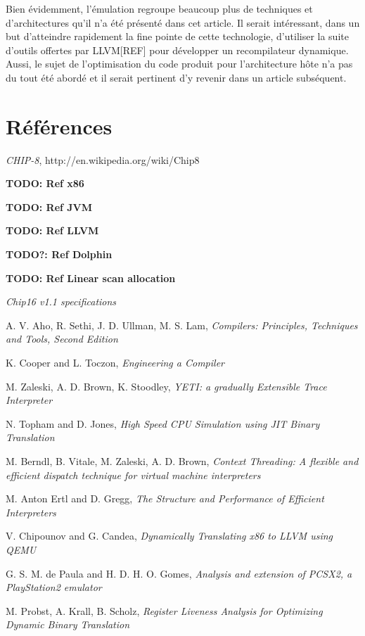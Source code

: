 \documentclass{article} %
\begin{document}
Bien évidemment, l'émulation regroupe beaucoup plus de techniques et d'architectures qu'il n'a été présenté dans cet article. Il serait intéressant, dans un but d'atteindre rapidement la fine pointe de cette technologie, d'utiliser la suite d'outils offertes par LLVM[REF] pour développer un recompilateur dynamique. Aussi, le sujet de l'optimisation du code produit pour l'architecture hôte n'a pas du tout été abordé et il serait pertinent d'y revenir dans un article subséquent.

\section{Références}
\small{
\textit{CHIP-8}, http://en.wikipedia.org/wiki/Chip8

\textbf{TODO: Ref x86}

\textbf{TODO: Ref JVM}

\textbf{TODO: Ref LLVM}

\textbf{TODO?: Ref Dolphin}

\textbf{TODO: Ref Linear scan allocation}

\textit{Chip16 v1.1 specifications}

A. V. Aho, R. Sethi, J. D. Ullman, M. S. Lam, \textit{Compilers: Principles, Techniques and Tools, Second Edition}

K. Cooper and L. Toczon, \textit{Engineering a Compiler}

M. Zaleski, A. D. Brown, K. Stoodley, \textit{YETI: a gradually Extensible Trace Interpreter}

N. Topham and D. Jones, \textit{High Speed CPU Simulation using JIT Binary Translation}

M. Berndl, B. Vitale, M. Zaleski, A. D. Brown, \textit{Context Threading: A flexible and efficient dispatch technique for virtual machine interpreters}

M. Anton Ertl and D. Gregg, \textit{The Structure and Performance of Efficient Interpreters}

V. Chipounov and G. Candea, \textit{Dynamically Translating x86 to LLVM using QEMU}

G. S. M. de Paula and H. D. H. O. Gomes, \textit{Analysis and extension of PCSX2, a PlayStation2 emulator}

M. Probst, A. Krall, B. Scholz, \textit{Register Liveness Analysis for Optimizing Dynamic Binary Translation}
}
\end{document}
